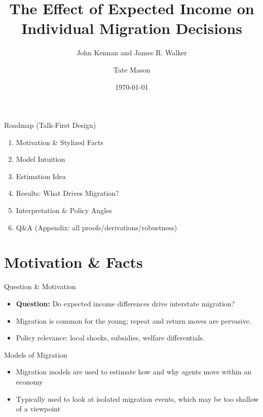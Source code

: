 \documentclass[aspectratio=169,professionalfonts]{beamer}
\title[Migration Decisions]{The Effect of Expected Income on Individual Migration Decisions}
\subtitle{John Kennan and James R. Walker}
\author[Tate Mason]{Tate Mason}
\institute[UGA]{John Munro Godfrey Sr. Dept. of Economics \\ University of Georgia}
\date{\today}
\newcommand{\hl}[1]{\textbf{\textcolor{UGARed}{#1}}}
\newcommand{\hl}[1]{\textbf{\color{UGARed}{#1}}}
\begin{document}
\begin{frame}
  \titlepage
\end{frame}

\begin{frame}{Roadmap (Talk-First Design)}
  \begin{enumerate}
    \item Motivation \& Stylized Facts
    \item Model Intuition 
    \item Estimation Idea
    \item Results: What Drives Migration?
    \item Interpretation \& Policy Angles
    \item Q\&A (Appendix: all proofs/derivations/robustness)
  \end{enumerate}
  \vspace{0.5em}
\end{frame}

\section{Motivation \& Facts}

\begin{frame}{Question \& Motivation}
  \begin{itemize}
    \item \hl{Question:} Do expected income differences drive interstate migration?
    \item Migration is common for the young; repeat and return moves are pervasive.
    \item Policy relevance: local shocks, subsidies, welfare differentials.
  \end{itemize}
\end{frame}

\begin{frame}{Models of Migration}
  \begin{itemize}
    \item Migration models are used to estimate how and why agents move within an economy
    \item Typically used to look at isolated migration events, which may be too shallow of a viewpoint
  \end{itemize}
\end{frame}
\end{document}
